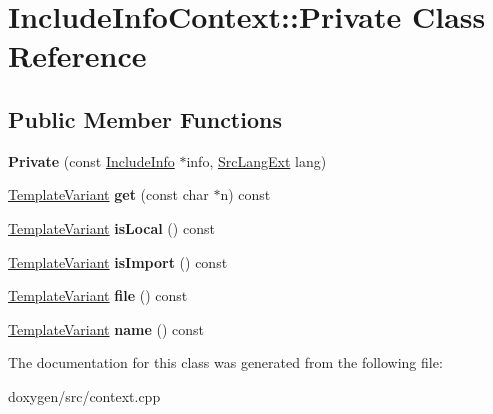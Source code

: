 \hypertarget{class_include_info_context_1_1_private}{}\section{Include\+Info\+Context\+::Private Class Reference}
\label{class_include_info_context_1_1_private}
\subsection*{Public Member Functions}
\begin{DoxyCompactItemize}
\item 
\mbox{\label{class_include_info_context_1_1_private_a3355e373355ffd73c8b598238b726e78}} 
{\bfseries Private} (const \mbox{\hyperlink{struct_include_info}{Include\+Info}} $\ast$info, \mbox{\hyperlink{types_8h_a9974623ce72fc23df5d64426b9178bf2}{Src\+Lang\+Ext}} lang)
\item 
\mbox{\label{class_include_info_context_1_1_private_a2bd07287d3c56e84ca582f1f39dcac14}} 
\mbox{\hyperlink{class_template_variant}{Template\+Variant}} {\bfseries get} (const char $\ast$n) const
\item 
\mbox{\label{class_include_info_context_1_1_private_a672b836cebf9bf83755b69716089c1b0}} 
\mbox{\hyperlink{class_template_variant}{Template\+Variant}} {\bfseries is\+Local} () const
\item 
\mbox{\label{class_include_info_context_1_1_private_a169b7a32981cce9ef50ef60b4a9f0e62}} 
\mbox{\hyperlink{class_template_variant}{Template\+Variant}} {\bfseries is\+Import} () const
\item 
\mbox{\label{class_include_info_context_1_1_private_a80626feffca0d8caea4d285c632da43f}} 
\mbox{\hyperlink{class_template_variant}{Template\+Variant}} {\bfseries file} () const
\item 
\mbox{\label{class_include_info_context_1_1_private_a8c6829b6f42a3e64be93842069e4c655}} 
\mbox{\hyperlink{class_template_variant}{Template\+Variant}} {\bfseries name} () const
\end{DoxyCompactItemize}


The documentation for this class was generated from the following file\+:\begin{DoxyCompactItemize}
\item 
doxygen/src/context.\+cpp\end{DoxyCompactItemize}

